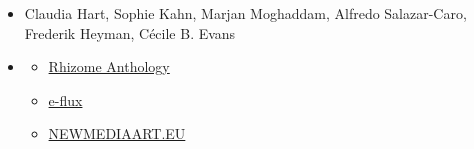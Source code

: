 \begin{itemize}[noitemsep,topsep=0pt,leftmargin=*]
    \item {} Claudia Hart, Sophie Kahn, Marjan Moghaddam, Alfredo Salazar-Caro, Frederik Heyman, Cécile B. Evans
    \item {}
          \begin{resenv}
              \begin{itemize}
                  \item \href{https://anthology.rhizome.org/}{Rhizome Anthology}
                  \item \href{https://www.e-flux.com/journal/}{e-flux}
                  \item \href{https://www.newmediaart.eu/}{NEWMEDIAART.EU}
              \end{itemize}
          \end{resenv}
\end{itemize}